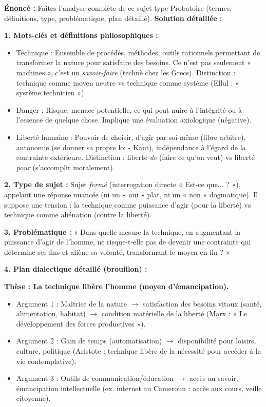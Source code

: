 \documentclass[11pt]{article}
\newcommand{\cle}[1]{{\popxbold\color{popdark}#1}}
\begin{document}
\begin{exoresolu}
\textbf{Énoncé :} Faites l'analyse complète de ce sujet type Probatoire (termes, définitions, type, problématique, plan détaillé).
\tcblower
\textbf{Solution détaillée :}

\textbf{1. Mots-clés et définitions philosophiques :}
\begin{itemize}
    \item \cle{Technique} : Ensemble de procédés, méthodes, outils rationnels permettant de transformer la nature pour satisfaire des besoins. Ce n'est pas seulement « machines », c'est un \emph{savoir-faire} (technè chez les Grecs). Distinction : technique comme moyen neutre vs technique comme système (Ellul : « système technicien »).
    \item \cle{Danger} : Risque, menace potentielle, ce qui peut nuire à l'intégrité ou à l'essence de quelque chose. Implique une évaluation axiologique (négative).
    \item \cle{Liberté humaine} : Pouvoir de choisir, d'agir par soi-même (libre arbitre), autonomie (se donner sa propre loi - Kant), indépendance à l'égard de la contrainte extérieure. Distinction : liberté \emph{de} (faire ce qu'on veut) vs liberté \emph{pour} (s'accomplir moralement).
\end{itemize}

\textbf{2. Type de sujet :} Sujet \emph{fermé} (interrogation directe « Est-ce que... ? »), appelant une réponse nuancée (ni un « oui » plat, ni un « non » dogmatique). Il suppose une tension : la technique comme puissance d'agir (pour la liberté) vs technique comme aliénation (contre la liberté).

\textbf{3. Problématique :}
« Dans quelle mesure la technique, en augmentant la puissance d'agir de l'homme, ne risque-t-elle pas de devenir une contrainte qui détermine ses fins et aliène sa volonté, transformant le moyen en fin ? »

\textbf{4. Plan dialectique détaillé (brouillon) :}

\textbf{Thèse : La technique libère l'homme (moyen d'émancipation).}
\begin{itemize}
    \item Argument 1 : Maîtrise de la nature $\rightarrow$ satisfaction des besoins vitaux (santé, alimentation, habitat) $\rightarrow$ condition matérielle de la liberté (Marx : « Le développement des forces productives »).
    \item Argument 2 : Gain de temps (automatisation) $\rightarrow$ disponibilité pour loisirs, culture, politique (Aristote : technique libère de la nécessité pour accéder à la vie contemplative).
    \item Argument 3 : Outils de communication/éducation $\rightarrow$ accès au savoir, émancipation intellectuelle (ex. internet au Cameroun : accès aux cours, veille citoyenne).
\end{itemize}


\end{exoresolu}
\end{document}
